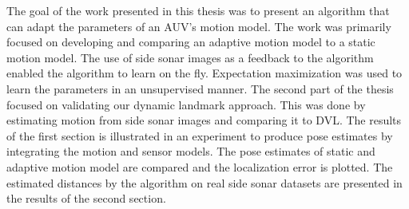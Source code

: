 \documentclass[12pt]{dalcsthesis}
\begin{document}
The goal of the work presented in this thesis was to present an algorithm that can adapt the parameters of an AUV's motion model. The work was primarily focused on developing and comparing an adaptive motion model to a static motion model. The use of side sonar images as a feedback to the algorithm enabled the algorithm to learn on the fly. Expectation maximization was used to learn the parameters in an unsupervised manner. The second part of the thesis focused on validating our dynamic landmark approach. This was done by estimating motion from side sonar images and comparing it to DVL. The results of the first section is illustrated in an experiment to produce pose estimates by integrating the motion and sensor models. The pose estimates of static and adaptive motion model are compared and the localization error is plotted. The estimated distances by the algorithm on real side sonar datasets are presented in the results of the second section. 
\end{document}
